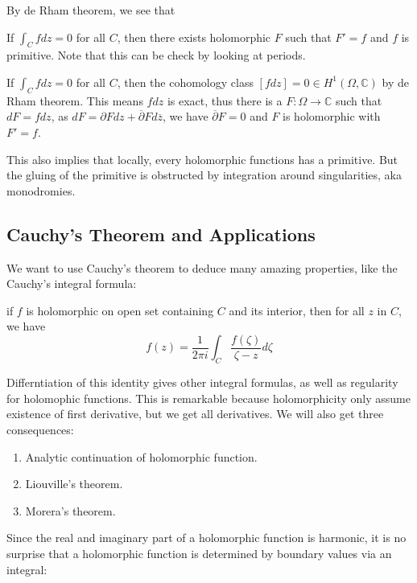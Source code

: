 \documentclass[main.tex]{subfiles}
\begin{document}
By de Rham theorem, we see that 
\begin{theorem}
If $\int_C f dz = 0$ for all $C$, then there exists holomorphic $F$ such that $F' = f$ and $f$ is primitive. Note that this can be check by looking at periods.
\end{theorem}

\begin{theorem}
If $\int_C f dz = 0$ for all $C$, then the cohomology class $[f dz] = 0 \in H^1(\Omega, \mathbb{C})$  by de Rham theorem. This means $f dz$ is exact, thus there is a $F: \Omega \rightarrow \mathbb{C}$ such that $dF = f dz$, as $dF = \partial F dz + \overline{\partial} F d\overline{z}$, we have $\overline{\partial} F = 0$ and $F$ is holomorphic with $F' = f$.
\end{theorem}

This also implies that locally, every holomorphic functions has a primitive. But the gluing of the primitive is obstructed by integration around singularities, aka monodromies.

\subsection{Cauchy's Theorem and Applications}
We want to use Cauchy's theorem to deduce many amazing properties, like the Cauchy's integral formula:

\begin{theorem}
if $f$ is holomorphic on open set containing $C$ and its interior, then for all $z$ in $C$, we have 
$$
f(z) = \frac{1}{2\pi i} \int_C \frac{f(\zeta)}{\zeta - z} d\zeta
$$
\end{theorem}

Differntiation of this identity gives other integral formulas, as well as regularity for holomophic functions. This is remarkable because holomorphicity only assume existence of first derivative, but we get all derivatives. We will also get three consequences:

\begin{enumerate}
    \item Analytic continuation of holomorphic function. 
    \item Liouville's theorem.
    \item Morera's theorem.
\end{enumerate}

Since the real and imaginary part of a holomorphic function is harmonic, it is no surprise that a holomorphic function is determined by boundary values via an integral:
\end{document}

